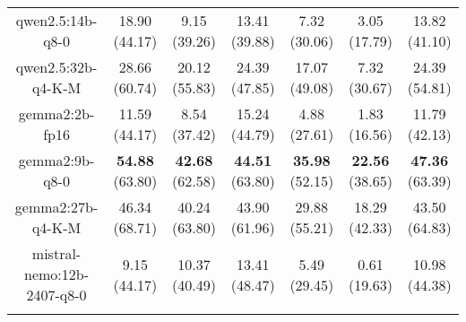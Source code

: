 \begin{table}[hbp]
{\begin{tabular}{ccccccc}
      \multicolumn{1}{c|}{qwen2.5:14b-q8-0} & 18.90 (44.17) & 9.15 (39.26) & \multicolumn{1}{c|}{13.41 (39.88)} & 7.32 (30.06) & \multicolumn{1}{c|}{3.05 (17.79)} & 13.82 (41.10) \\

      \multicolumn{1}{c|}{qwen2.5:32b-q4-K-M} & 28.66 (60.74) & 20.12 (55.83) & \multicolumn{1}{c|}{24.39 (47.85)} & 17.07 (49.08) & \multicolumn{1}{c|}{7.32 (30.67)} & 24.39 (54.81) \\

      \multicolumn{1}{c|}{gemma2:2b-fp16} & 11.59 (44.17) & 8.54 (37.42) & \multicolumn{1}{c|}{15.24 (44.79)} & 4.88 (27.61) & \multicolumn{1}{c|}{1.83 (16.56)} & 11.79 (42.13) \\

      \multicolumn{1}{c|}{gemma2:9b-q8-0} & \textbf{54.88} (63.80) & \textbf{42.68} (62.58) & \multicolumn{1}{c|}{\textbf{44.51} (63.80)} & \textbf{35.98} (52.15) & \multicolumn{1}{c|}{\textbf{22.56} (38.65)} & \textbf{47.36} (63.39) \\

      \multicolumn{1}{c|}{gemma2:27b-q4-K-M} & 46.34 (68.71) & 40.24 (63.80) & \multicolumn{1}{c|}{43.90 (61.96)} & 29.88 (55.21) & \multicolumn{1}{c|}{18.29 (42.33)} & 43.50 (64.83) \\

      \multicolumn{1}{c|}{mistral-nemo:12b-2407-q8-0} & 9.15 (44.17) & 10.37 (40.49) & \multicolumn{1}{c|}{13.41 (48.47)} & 5.49 (29.45) & \multicolumn{1}{c|}{0.61 (19.63)} & 10.98 (44.38) \\

      \\ \hline
    \end{tabular}%
  }
\end{table}